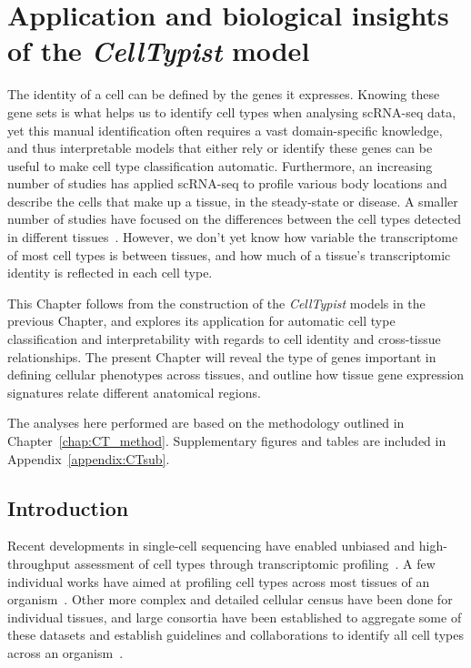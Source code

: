 \chapter{Application and biological insights of the \textit{CellTypist} model} \label{chap:CT_test}

\ifpdf
    \graphicspath{{Chapter4/Figs/Raster/}{Chapter4/Figs/PDF/}{Chapter4/Figs/}}
\else
    \graphicspath{{Chapter4/Figs/Vector/}{Chapter4/Figs/}}
\fi
The identity of a cell can be defined by the genes it expresses. Knowing these gene sets is what helps us to identify cell types when analysing scRNA-seq data, yet this manual identification often requires a vast domain-specific knowledge, and thus interpretable models that either rely or identify these genes can be useful to make cell type classification automatic. Furthermore, an increasing number of studies has applied scRNA-seq to profile various body locations and describe the cells that make up a tissue, in the steady-state or disease. A smaller number of studies have focused on the differences between the cell types detected in different tissues~\citep{miragaia_single-cell_2019,scott_transcription_2018}. However, we don't yet know how variable the transcriptome of most cell types is between tissues, and how much of a tissue's transcriptomic identity is reflected in each cell type.

This Chapter follows from the construction of the \textit{CellTypist} models in the previous Chapter, and explores its application for automatic cell type classification and interpretability with regards to cell identity and cross-tissue relationships. The present Chapter will reveal the type of genes important in defining cellular phenotypes across tissues, and outline how tissue gene expression signatures relate different anatomical regions.

The analyses here performed are based on the methodology outlined in Chapter~\ref{chap:CT_method}. Supplementary figures and tables are included in Appendix~\ref{appendix:CTsub}.


\section{Introduction}
\label{section4.1}
Recent developments in single-cell sequencing have enabled unbiased and high-throughput assessment of cell types through transcriptomic profiling~\citep{svensson_exponential_2018}. A few individual works have aimed at profiling cell types across most tissues of an organism~\citep{fincher_cell_2018,plass_cell_2018,han_mapping_2018,noauthor_single-cell_2018}. Other more complex and detailed cellular census have been done for individual tissues, and large consortia have been established to aggregate some of these datasets and establish guidelines and collaborations to identify all cell types across an organism~\citep{regev_human_2017}.


